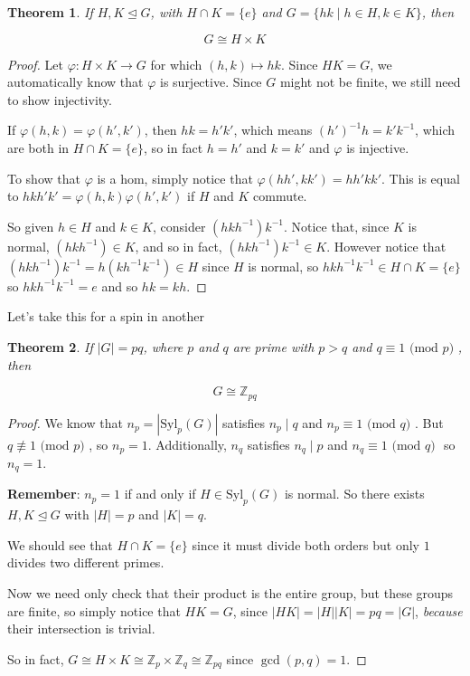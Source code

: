 \documentclass[12pt]{article}
\def\Syl{\text{Syl}}
\def\Z{{\mathbb Z}}
\renewcommand{\mod}[1]{\text{ (mod $#1$) }}
\newtheorem{theorem}{Theorem}
\theoremstyle{remark}
\theoremstyle{remark}
\theoremstyle{remark}
\theoremstyle{remark}
\theoremstyle{remark}
\begin{document}
\begin{theorem}
  If $H, K \trianglelefteq G$, with $H \cap K = \{e\}$ and $G = \{hk \mid h \in
  H, k \in K \}$, then

  \[
    G \cong H \times K
  \]
\end{theorem}

\begin{proof}
  Let $\varphi: H \times K \to G$ for which $(h, k) \mapsto hk$.
  Since $HK = G$, we automatically know that $\varphi$ is surjective. Since $G$
  might not be finite, we still need to show injectivity.

  If $\varphi(h, k) = \varphi(h', k')$, then $hk = h'k'$, which means $(h')^{-1}h
  = k'k^{-1}$, which are both in $H \cap K = \{e\}$, so in fact $h = h'$ and $k =
  k'$ and $\varphi$ is injective.

  To show that $\varphi$ is a hom, simply notice that $\varphi(hh', kk') =
  hh'kk'$. This is equal to $hkh'k' = \varphi(h, k)\varphi(h', k')$ if $H$ and $K$
  commute.

  So given $h \in H$ and $k \in K$, consider $(hkh^{-1})k^{-1}$. Notice that,
  since $K$ is normal, $(hkh^{-1}) \in K$, and so in fact, $(hkh^{-1})k^{-1} \in
  K$. However notice that $(hkh^{-1})k^{-1} = h(kh^{-1}k^{-1}) \in H$ since $H$ is
  normal, so $hkh^{-1}k^{-1} \in H \cap K = \{e\}$ so $hkh^{-1}k^{-1} = e$ and so
  $hk = kh$.
\end{proof}

Let's take this for a spin in another

\begin{theorem}
  If $|G| = pq$, where $p$ and $q$ are prime with $p > q$ and $q \equiv 1 \mod
  p$, then

  \[
    G \cong \Z_{pq}
  \]
\end{theorem}

\begin{proof}
  We know that $n_p = |\Syl_p(G)|$ satisfies $n_p \mid q$ and $n_p \equiv 1 \mod
  q$. But $q \not\equiv 1 \mod p$, so $n_p = 1$. Additionally, $n_q$ satisfies $n_q
  \mid p$ and $n_q \equiv 1 \mod q$ so $n_q = 1$.

  {\bf Remember}: $n_p = 1$ if and only if $H \in \Syl_p(G)$ is normal. So there
  exists $H, K \trianglelefteq G$ with $|H| = p$ and $|K| = q$.

  We should see that $H \cap K = \{e\}$ since it must divide both orders but
  only $1$ divides two different primes.

  Now we need only check that their product is the entire group, but these
  groups are finite, so simply notice that $HK = G$, since $|HK| = |H||K| = pq =
  |G|$, {\it because} their intersection is trivial.

  So in fact, $G \cong H \times K \cong \Z_p \times \Z_q \cong \Z_{pq}$ since
  $\gcd(p, q) = 1$.
\end{proof}
\end{document}
